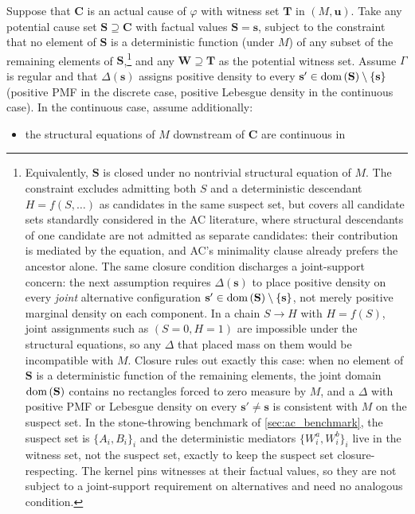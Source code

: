 \begin{theorem}\label{th:ac-exp}
    Suppose that $\mathbf{C}$ is an actual cause of $\varphi$ with witness set $\mathbf{T}$ in $(M,\mathbf{u})$. Take any potential cause set $\mathbf{S}\supseteq\mathbf{C}$ with factual values $\mathbf{S}=\mathbf{s}$, subject to the constraint that no element of $\mathbf{S}$ is a deterministic function (under $M$) of any subset of the remaining elements of $\mathbf{S}$,\footnote{Equivalently, $\mathbf{S}$ is closed under no nontrivial structural equation of $M$. The constraint excludes admitting both $S$ and a deterministic descendant $H=f(S,\ldots)$ as candidates in the same suspect set, but covers all candidate sets standardly considered in the AC literature, where structural descendants of one candidate are not admitted as separate candidates: their contribution is mediated by the equation, and AC's minimality clause already prefers the ancestor alone. The same closure condition discharges a joint-support concern: the next assumption requires $\Delta(\mathbf{s})$ to place positive density on every \emph{joint} alternative configuration $\mathbf{s}'\in\operatorname{dom}\,(\mathbf{S})\setminus\{\mathbf{s}\}$, not merely positive marginal density on each component. In a chain $S\to H$ with $H=f(S)$, joint assignments such as $(S{=}0, H{=}1)$ are impossible under the structural equations, so any $\Delta$ that placed mass on them would be incompatible with $M$. Closure rules out exactly this case: when no element of $\mathbf{S}$ is a deterministic function of the remaining elements, the joint domain $\operatorname{dom}\,(\mathbf{S})$ contains no rectangles forced to zero measure by $M$, and a $\Delta$ with positive PMF or Lebesgue density on every $\mathbf{s}'\neq\mathbf{s}$ is consistent with $M$ on the suspect set. In the stone-throwing benchmark of \cref{sec:ac_benchmark}, the suspect set is $\{A_i,B_i\}_i$ and the deterministic mediators $\{W^a_i,W^b_i\}_i$ live in the witness set, not the suspect set, exactly to keep the suspect set closure-respecting. The kernel pins witnesses at their factual values, so they are not subject to a joint-support requirement on alternatives and need no analogous condition.} and any $\mathbf{W}\supseteq\mathbf{T}$ as the potential witness set. Assume $\Gamma$ is regular and that $\Delta(\mathbf{s})$ assigns positive density to every $\mathbf{s}'\in\operatorname{dom}\,(\mathbf{S})\setminus\{\mathbf{s}\}$ (positive PMF in the discrete case, positive Lebesgue density in the continuous case). In the continuous case, assume additionally:
    \begin{itemize}
    \item[(i)] the structural equations of $M$ downstream of $\mathbf{C}$ are continuous in

\end{itemize}
\end{theorem}
